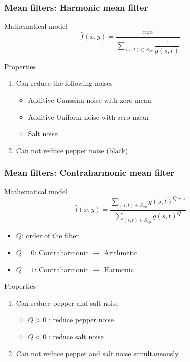 \documentclass[english,11pt,table,handout]{beamer}
\begin{document}
\frame
{
	\frametitle{Mean filters: Harmonic mean filter}
	
	\begin{block}{Mathematical model}
		\begin{equation*}
		\nonumber
		\hat{f}(x,y) = \dfrac{mn}{\sum\limits_{(s,t) \in S_{xy}}{\dfrac{1}{g(s,t)}}}
		\end{equation*}
	\end{block}
	
	\begin{alertblock}{Properties}
		\begin{enumerate}
			\item Can reduce the following noises
			\begin{itemize}
				\item Additive Gaussian noise with zero mean
				\item Additive Uniform noise with zero mean
				\item Salt noise
			\end{itemize}
			\item Can not reduce pepper noise (black)
		\end{enumerate}
	\end{alertblock}
	
}
\frame
{
	\frametitle{Mean filters: Contraharmonic mean filter}
	
	\begin{block}{Mathematical model}
		\begin{equation*}
		\nonumber
		\hat{f}(x,y) = \dfrac{\sum\limits_{(s,t) \in S_{xy}}{g(s,t)^{Q+1}}}
		{\sum\limits_{(s,t) \in S_{xy}}{g(s,t)^Q}}
		\end{equation*}
		\begin{itemize}
			\item $Q$: order of the filter
			\item $Q=0$: Contraharmonic $\rightarrow$ Arithmetic
			\item $Q=1$: Contraharmonic $\rightarrow$ Harmonic
		\end{itemize}
	\end{block}
	
	\begin{alertblock}{Properties}
		\begin{enumerate}
			\item Can reduce pepper-and-salt noise
			\begin{itemize}
				\item $Q > 0$ : reduce pepper noise
				\item $Q < 0$ : reduce salt noise
			\end{itemize}
			\item Can not reduce pepper and salt noise simultaneously
		\end{enumerate}
	\end{alertblock}
	
}
\end{document}
